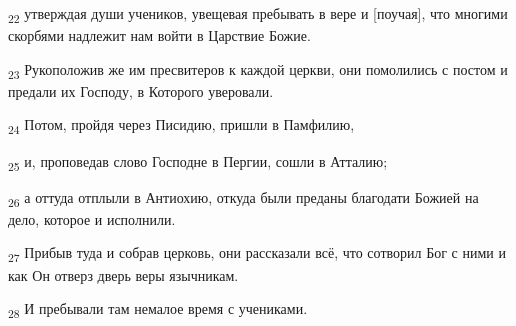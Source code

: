 \begin{tcolorbox}
\textsubscript{22} утверждая души учеников, увещевая пребывать в вере и [поучая], что многими скорбями надлежит нам войти в Царствие Божие.
\end{tcolorbox}
\begin{tcolorbox}
\textsubscript{23} Рукоположив же им пресвитеров к каждой церкви, они помолились с постом и предали их Господу, в Которого уверовали.
\end{tcolorbox}
\begin{tcolorbox}
\textsubscript{24} Потом, пройдя через Писидию, пришли в Памфилию,
\end{tcolorbox}
\begin{tcolorbox}
\textsubscript{25} и, проповедав слово Господне в Пергии, сошли в Атталию;
\end{tcolorbox}
\begin{tcolorbox}
\textsubscript{26} а оттуда отплыли в Антиохию, откуда были преданы благодати Божией на дело, которое и исполнили.
\end{tcolorbox}
\begin{tcolorbox}
\textsubscript{27} Прибыв туда и собрав церковь, они рассказали всё, что сотворил Бог с ними и как Он отверз дверь веры язычникам.
\end{tcolorbox}
\begin{tcolorbox}
\textsubscript{28} И пребывали там немалое время с учениками.
\end{tcolorbox}
